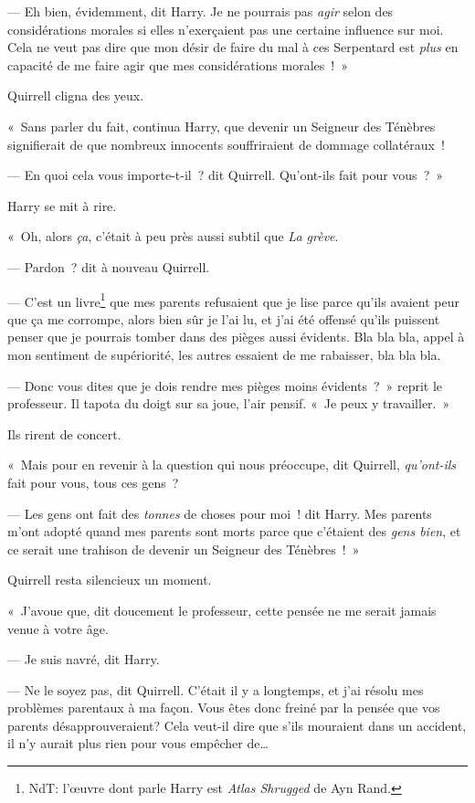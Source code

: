 --- Eh bien, évidemment, dit Harry.
Je ne pourrais pas \emph{agir} selon des considérations morales si elles n'exerçaient pas une certaine influence sur moi.
Cela ne veut pas dire que mon désir de faire du mal à ces Serpentard est \emph{plus} en capacité de me faire agir que mes considérations morales~!~»

Quirrell cligna des yeux.

«~Sans parler du fait, continua Harry, que devenir un Seigneur des Ténèbres signifierait de que nombreux innocents souffriraient de dommage collatéraux~!

--- En quoi cela vous importe-t-il~? dit Quirrell.
Qu'ont-ils fait pour vous~?~»

Harry se mit à rire.

«~Oh, alors \emph{ça}, c'était à peu près aussi subtil que \emph{La grève}.

--- Pardon~? dit à nouveau Quirrell.

--- C'est un livre\footnote{NdT: l'œuvre dont parle Harry est \textit{Atlas Shrugged} de Ayn Rand.} que mes parents refusaient que je lise parce qu'ils avaient peur que ça me corrompe, alors bien sûr je l'ai lu, et j'ai été offensé qu'ils puissent penser que je pourrais tomber dans des pièges aussi évidents.
Bla bla bla, appel à mon sentiment de supériorité, les autres essaient de me rabaisser, bla bla bla.

--- Donc vous dites que je dois rendre mes pièges moins évidents~?~»
reprit le professeur.
Il tapota du doigt sur sa joue, l'air pensif.
«~Je peux y travailler.~»

Ils rirent de concert.

«~Mais pour en revenir à la question qui nous préoccupe, dit Quirrell, \emph{qu'ont-ils} fait pour vous, tous ces gens~?

--- Les gens ont fait des \emph{tonnes} de choses pour moi~! dit Harry.
Mes parents m'ont adopté quand mes parents sont morts parce que c'étaient des \emph{gens bien}, et ce serait une trahison de devenir un Seigneur des Ténèbres~!~»

Quirrell resta silencieux un moment.

«~J'avoue que, dit doucement le professeur, cette pensée ne me serait jamais venue à votre âge.

--- Je suis navré, dit Harry.

--- Ne le soyez pas, dit Quirrell.
C'était il y a longtemps, et j'ai résolu mes problèmes parentaux à ma façon.
Vous êtes donc freiné par la pensée que vos parents désapprouveraient?
Cela veut-il dire que s'ils mouraient dans un accident, il n'y aurait plus rien pour vous empêcher de…

